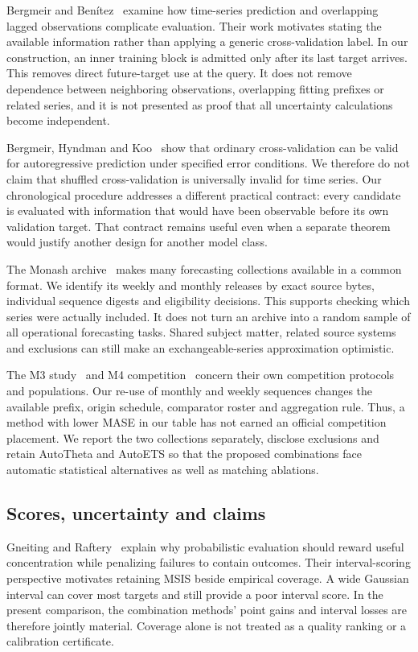 Bergmeir and Ben\'itez~\cite{berg2012} examine how time-series prediction and overlapping lagged observations complicate evaluation. Their work motivates stating the available information rather than applying a generic cross-validation label. In our construction, an inner training block is admitted only after its last target arrives. This removes direct future-target use at the query. It does not remove dependence between neighboring observations, overlapping fitting prefixes or related series, and it is not presented as proof that all uncertainty calculations become independent.

Bergmeir, Hyndman and Koo~\cite{berg2018} show that ordinary cross-validation can be valid for autoregressive prediction under specified error conditions. We therefore do not claim that shuffled cross-validation is universally invalid for time series. Our chronological procedure addresses a different practical contract: every candidate is evaluated with information that would have been observable before its own validation target. That contract remains useful even when a separate theorem would justify another design for another model class.

The Monash archive~\cite{monash} makes many forecasting collections available in a common format. We identify its weekly and monthly releases by exact source bytes, individual sequence digests and eligibility decisions. This supports checking which series were actually included. It does not turn an archive into a random sample of all operational forecasting tasks. Shared subject matter, related source systems and exclusions can still make an exchangeable-series approximation optimistic.

The M3 study~\cite{m3study} and M4 competition~\cite{m4study} concern their own competition protocols and populations. Our re-use of monthly and weekly sequences changes the available prefix, origin schedule, comparator roster and aggregation rule. Thus, a method with lower MASE in our table has not earned an official competition placement. We report the two collections separately, disclose exclusions and retain AutoTheta and AutoETS so that the proposed combinations face automatic statistical alternatives as well as matching ablations.

\subsection{Scores, uncertainty and claims}
Gneiting and Raftery~\cite{proper} explain why probabilistic evaluation should reward useful concentration while penalizing failures to contain outcomes. Their interval-scoring perspective motivates retaining MSIS beside empirical coverage. A wide Gaussian interval can cover most targets and still provide a poor interval score. In the present comparison, the combination methods' point gains and interval losses are therefore jointly material. Coverage alone is not treated as a quality ranking or a calibration certificate.

